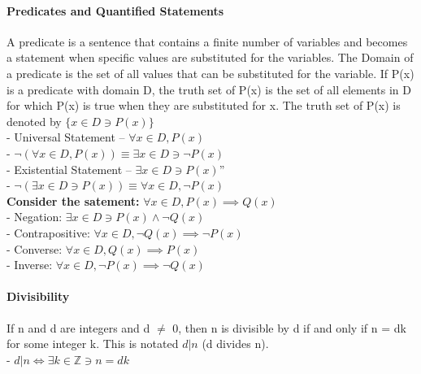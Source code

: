 \documentclass[10pt,letterpaper]{article}
\begin{document}
\begin{multicols}{2}
\paragraph*{Predicates and Quantified Statements} A predicate is a sentence that contains a finite number of variables and becomes a statement when specific values are substituted for the variables. 
The Domain of a predicate is the set of all values that can be substituted for the variable. If P(x) is a predicate with domain D, the truth set of P(x) is the set of all elements in D 
for which P(x) is true when they are substituted for x. The truth set of P(x) is denoted by $\{x \in D \ni P(x)\}$\\
- Universal Statement -- $\forall x \in D, P(x)$\\
- $\neg(\forall x \in D, P(x)) \equiv \exists x \in D \ni \neg P(x)$\\
- Existential Statement -- $\exists x \in D \ni P(x)$''\\
- $\neg(\exists x \in D \ni P(x)) \equiv \forall x \in D, \neg P(x)$\\
\textbf{Consider the satement:} $\forall x \in D, P(x) \implies Q(x)$\\
- Negation: $\exists x \in D \ni P(x) \land \neg Q(x)$\\
- Contrapositive: $\forall x \in D, \neg Q(x) \implies \neg P(x)$\\
- Converse: $\forall x \in D, Q(x) \implies P(x)$\\
- Inverse: $\forall x \in D, \neg P(x) \implies \neg Q(x)$

\paragraph*{Divisibility} If n and d are integers and d $\neq$ 0, then n is divisible by d if and only if n = dk for some integer k. This is notated $d|n$ (d divides n).\\
- $d|n \iff \exists k \in \mathbb{Z} \ni n=dk$\\


\end{multicols}

\newpage
\end{document}
